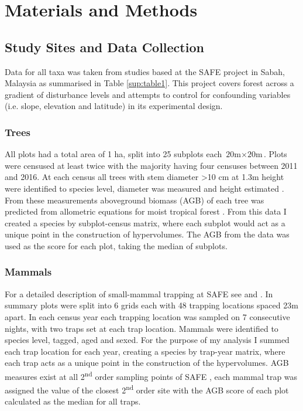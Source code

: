 
\section{Materials and Methods}


\subsection{Study Sites and Data Collection}

	Data for all taxa was taken from studies based at the SAFE project in Sabah, Malaysia \citep{Ewers2011} as summarised in Table \ref{sup:table1}. This project covers forest across a gradient of disturbance levels and attempts to control for confounding variables (i.e. slope, elevation and latitude) in its experimental design. 

	\subsubsection*{Trees}
	
	All plots had a total area of 1 ha, split into 25 subplots each $\text{20m} \times \text{20m}$. Plots were censused at least twice with the majority having four censuses between 2011 and 2016. At each census all trees with stem diameter >10 cm at 1.3m height were identified to species level, diameter was measured and height estimated \citep{Riutta2018}. From these measurements aboveground biomass (AGB) of each tree was predicted from allometric equations for moist tropical forest \citep{Chave2005}. From this data I created a species by subplot-census matrix, where each subplot would act as a unique point in the construction of hypervolumes. The AGB from the data was used as the score for each plot, taking the median of subplots.

	\subsubsection*{Mammals}
	
	For a detailed description of small-mammal trapping at SAFE see \cite{Wearn2017} and \cite{Chapman2018}. In summary plots were split into 6 grids each with 48 trapping locations spaced 23m apart. In each census year each trapping location was sampled on 7 consecutive nights, with two traps set at each trap location. Mammals were identified to species level, tagged, aged and sexed. For the purpose of my analysis I summed each trap location for each year, creating a species by trap-year matrix, where each trap acts as a unique point in the construction of the hypervolumes. AGB measures exist at all 2\textsuperscript{nd} order sampling points of SAFE \citep{Pfeifer2016}, each mammal trap was assigned the value of the closest 2\textsuperscript{nd} order site with the AGB score of each plot calculated as the median for all traps.
	
